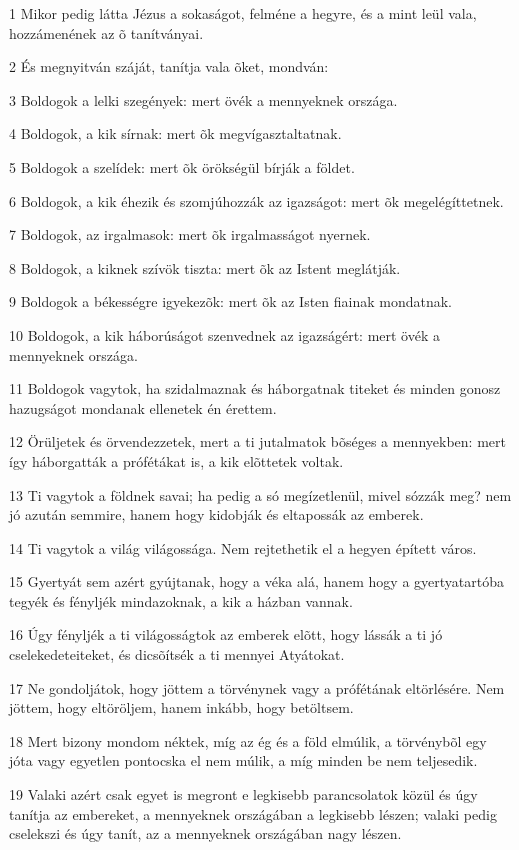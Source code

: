 \par 1 Mikor pedig látta Jézus a sokaságot, felméne a hegyre, és a mint leül vala, hozzámenének az õ tanítványai.
\par 2 És megnyitván száját, tanítja vala õket, mondván:
\par 3 Boldogok a lelki szegények: mert övék a mennyeknek országa.
\par 4 Boldogok, a kik sírnak: mert õk megvígasztaltatnak.
\par 5 Boldogok a szelídek: mert õk örökségül bírják a földet.
\par 6 Boldogok, a kik éhezik és szomjúhozzák az igazságot: mert õk megelégíttetnek.
\par 7 Boldogok, az irgalmasok: mert õk irgalmasságot nyernek.
\par 8 Boldogok, a kiknek szívök tiszta: mert õk az Istent meglátják.
\par 9 Boldogok a békességre igyekezõk: mert õk az Isten fiainak mondatnak.
\par 10 Boldogok, a kik háborúságot szenvednek az igazságért: mert övék a mennyeknek országa.
\par 11 Boldogok vagytok, ha szidalmaznak és háborgatnak titeket és minden gonosz hazugságot mondanak ellenetek én érettem.
\par 12 Örüljetek és örvendezzetek, mert a ti jutalmatok bõséges a mennyekben: mert így háborgatták a prófétákat is, a kik elõttetek voltak.
\par 13 Ti vagytok a földnek savai; ha pedig a só megízetlenül, mivel sózzák meg? nem jó azután semmire, hanem hogy kidobják és eltapossák az emberek.
\par 14 Ti vagytok a világ világossága. Nem rejtethetik el a hegyen épített város.
\par 15 Gyertyát sem azért gyújtanak, hogy a véka alá, hanem hogy a gyertyatartóba tegyék és fényljék mindazoknak, a kik a házban vannak.
\par 16 Úgy fényljék a ti világosságtok az emberek elõtt, hogy lássák a ti jó cselekedeteiteket, és dicsõítsék a ti mennyei Atyátokat.
\par 17 Ne gondoljátok, hogy jöttem a törvénynek vagy a prófétának eltörlésére. Nem jöttem, hogy eltöröljem, hanem inkább, hogy betöltsem.
\par 18 Mert bizony mondom néktek, míg az ég és a föld elmúlik, a törvénybõl egy jóta vagy egyetlen pontocska el nem múlik, a míg minden be nem teljesedik.
\par 19 Valaki azért csak egyet is megront e legkisebb parancsolatok közül és úgy tanítja az embereket, a mennyeknek országában a legkisebb lészen; valaki pedig cselekszi és úgy tanít, az a mennyeknek országában nagy lészen.
